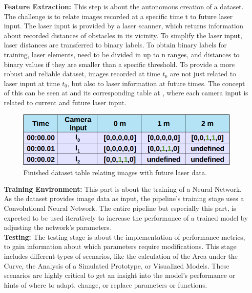 \textbf{Feature Extraction:} This step is about the autonomous creation of a dataset. The challenge is to relate images recorded at a specific time t to future laser input. The laser input is provided by a laser scanner, which returns information about recorded distances of obstacles in its vicinity. To simplify the laser input, laser distances are transferred to binary labels. To obtain binary labels for training, laser elements, need to be divided in up to n ranges, and distances to binary values if they are smaller than a specific threshold. To provide a more robust and reliable dataset, images recorded at time $t_{0}$ are not just related to laser input at time $t_{0}$, but also to laser information at future times. The concept of this can be seen at  and its corresponding table at , where each camera input is related to current and future laser input.

\begin{figure}[h]%
\centering
\captionsetup{width=.75\linewidth}
\includegraphics[width=0.75\linewidth]{Bilder/dataset_table.png} 
\caption{Finished dataset table relating images with future laser data.}
\label{dataset_table}
\end{figure}

\textbf{Training Environment:} This part is about the training of a Neural Network. As the dataset provides image data as input, the pipeline's training stage uses a Convolutional Neural Network. The entire pipeline but especially this part, is expected to be used iteratively to increase the performance of a trained model by adjusting the network's parameters.\\

\textbf{Testing:} The testing stage is about the implementation of performance metrics, to gain information about which parameters require modifications. This stage includes different types of scenarios, like the calculation of the Area under the Curve, the Analysis of a Simulated Prototype, or Visualized Models. These scenarios are highly critical to get an insight into the model's performance or hints of where to adapt, change, or replace parameters or functions.\\

